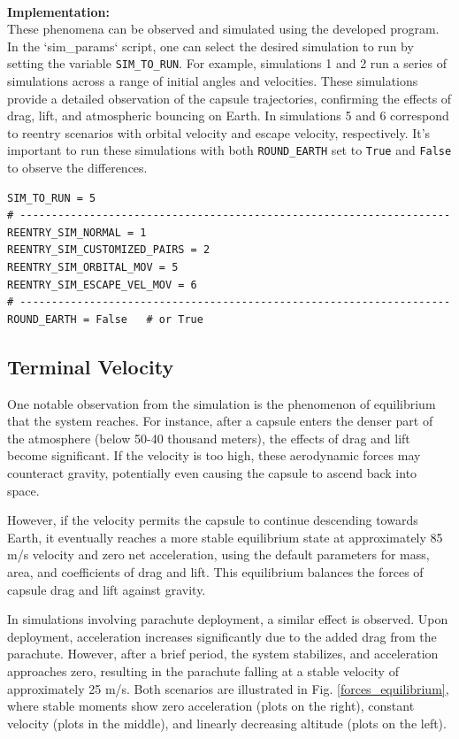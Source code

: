 \documentclass[runningheads]{llncs}
\begin{document}
\textbf{\\Implementation:\\}
These phenomena can be observed and simulated using the developed program. In the `sim\_params` script, one can select the desired simulation to run by setting the variable \texttt{SIM\_TO\_RUN}. For example, simulations 1 and 2 run a series of simulations across a range of initial angles and velocities. These simulations provide a detailed observation of the capsule trajectories, confirming the effects of drag, lift, and atmospheric bouncing on Earth. In simulations 5 and 6 correspond to reentry scenarios with orbital velocity and escape velocity, respectively. It's important to run these simulations with both \texttt{ROUND\_EARTH} set to \texttt{True} and \texttt{False} to observe the differences.

\begin{verbatim}
SIM_TO_RUN = 5
# --------------------------------------------------------------------
REENTRY_SIM_NORMAL = 1 
REENTRY_SIM_CUSTOMIZED_PAIRS = 2
REENTRY_SIM_ORBITAL_MOV = 5 
REENTRY_SIM_ESCAPE_VEL_MOV = 6  
# --------------------------------------------------------------------
ROUND_EARTH = False   # or True
\end{verbatim}



\subsection{Terminal Velocity}

One notable observation from the simulation is the phenomenon of equilibrium that the system reaches. For instance, after a capsule enters the denser part of the atmosphere (below 50-40 thousand meters), the effects of drag and lift become significant. If the velocity is too high, these aerodynamic forces may counteract gravity, potentially even causing the capsule to ascend back into space. 

However, if the velocity permits the capsule to continue descending towards Earth, it eventually reaches a more stable equilibrium state at approximately 85 m/s velocity and zero net acceleration, using the default parameters for mass, area, and coefficients of drag and lift. This equilibrium balances the forces of capsule drag and lift against gravity.

In simulations involving parachute deployment, a similar effect is observed. Upon deployment, acceleration increases significantly due to the added drag from the parachute. However, after a brief period, the system stabilizes, and acceleration approaches zero, resulting in the parachute falling at a stable velocity of approximately 25 m/s. Both scenarios are illustrated in Fig. \ref{forces_equilibrium}, where stable moments show zero acceleration (plots on the right), constant velocity (plots in the middle), and linearly decreasing altitude (plots on the left).
\end{document}
